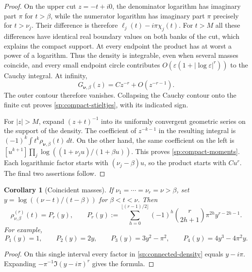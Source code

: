 \documentclass[11pt,letterpaper]{article}
\numberwithin{equation}{section}
\newtheorem{corollary}[theorem]{Corollary}
\theoremstyle{definition}
\theoremstyle{remark}
\begin{document}
\begin{proof}
On the upper cut $z=-t+i0$, the denominator logarithm has
imaginary part $\pi$ for $t>\beta$, while the numerator
logarithm has imaginary part $\pi$ precisely for $t>\nu_j$.
Their difference is therefore
$\ell_j(t)-i\pi\chi_j(t)$.
For $t>M$ all these differences have identical real boundary
values on both banks of the cut, which explains the compact
support.  At every endpoint the product has at worst a power of
a logarithm.  Thus the density is integrable, even when several
masses coincide, and every small endpoint circle contributes
$O(\varepsilon(1+|\log\varepsilon|^r))$ to the Cauchy integral.
At infinity,
\begin{equation}
 G_{\boldsymbol\nu,\beta}(z)=Cz^{-r}+O(z^{-r-1}).
 \label{sp:connected-asymptotic}
\end{equation}
The outer contour therefore vanishes.  Collapsing the Cauchy
contour onto the finite cut proves
\eqref{sp:compact-stieltjes}, with its indicated sign.

For $|z|>M$, expand $(z+t)^{-1}$ into its uniformly convergent
geometric series on the support of the density.  The coefficient
of $z^{-k-1}$ in the resulting integral is
$(-1)^k\int t^k\rho_{\boldsymbol\nu,\beta}(t)\,dt$.
On the other hand, the same coefficient on the left is
$[u^{k+1}]\prod_j\log((1+\nu_j u)/(1+\beta u))$.
This proves \eqref{sp:compact-moments}.  Each logarithmic factor
starts with $(\nu_j-\beta)u$, so the product starts with $Cu^r$.
The final two assertions follow.
\end{proof}

\begin{corollary}[Coincident masses]
\label{sp:coincident-density}
If $\nu_1=\cdots=\nu_r=\nu>\beta$, set
$y=\log((\nu-t)/(t-\beta))$ for $\beta<t<\nu$.  Then
\begin{equation}
 \rho_{\nu,\beta}^{(r)}(t)=P_r(y),\qquad
 P_r(y):=\sum_{h=0}^{\lfloor(r-1)/2\rfloor}
       (-1)^h\binom{r}{2h+1}\pi^{2h}y^{r-2h-1}.
 \label{sp:coincident-polynomial}
\end{equation}
For example,
\begin{equation}
 P_1(y)=1,\qquad P_2(y)=2y,\qquad
 P_3(y)=3y^2-\pi^2,\qquad P_4(y)=4y^3-4\pi^2y.
 \label{sp:coincident-examples}
\end{equation}
\end{corollary}

\begin{proof}
On this single interval every factor in
\eqref{sp:connected-density} equals $y-i\pi$.
Expanding $-\pi^{-1}\Im(y-i\pi)^r$ gives the formula.
\end{proof}
\end{document}
